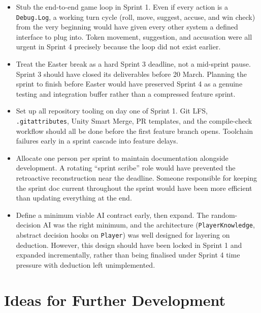 \begin{itemize}
    \item Stub the end-to-end game loop in Sprint 1. Even if every action is a \texttt{Debug.Log}, a working turn cycle (roll, move, suggest, accuse, and win check) from the very beginning would have given every other system a defined interface to plug into. Token movement, suggestion, and accusation were all urgent in Sprint 4 precisely because the loop did not exist earlier.
    \item Treat the Easter break as a hard Sprint 3 deadline, not a mid-sprint pause. Sprint 3 should have closed its deliverables before 20 March. Planning the sprint to finish before Easter would have preserved Sprint 4 as a genuine testing and integration buffer rather than a compressed feature sprint.
    \item Set up all repository tooling on day one of Sprint 1. Git LFS, \texttt{.gitattributes}, Unity Smart Merge, PR templates, and the compile-check workflow should all be done before the first feature branch opens. Toolchain failures early in a sprint cascade into feature delays.
    \item Allocate one person per sprint to maintain documentation alongside development. A rotating ``sprint scribe'' role would have prevented the retroactive reconstruction near the deadline. Someone responsible for keeping the sprint doc current throughout the sprint would have been more efficient than updating everything at the end.
    \item Define a minimum viable AI contract early, then expand. The random-decision AI was the right minimum, and the architecture (\texttt{PlayerKnowledge}, abstract decision hooks on \texttt{Player}) was well designed for layering on deduction. However, this design should have been locked in Sprint 1 and expanded incrementally, rather than being finalised under Sprint 4 time pressure with deduction left unimplemented.
\end{itemize}

\section{Ideas for Further Development}

